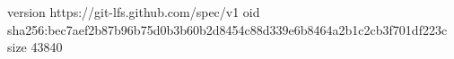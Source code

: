 version https://git-lfs.github.com/spec/v1
oid sha256:bec7aef2b87b96b75d0b3b60b2d8454c88d339e6b8464a2b1c2cb3f701df223c
size 43840
